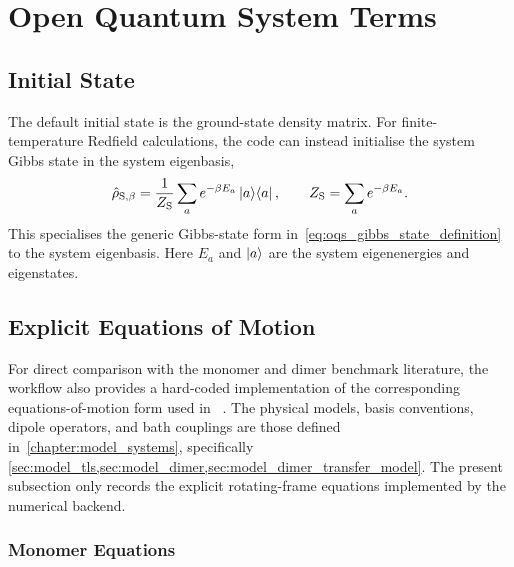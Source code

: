 \section{Open Quantum System Terms}
\label{app:sec:oqs_evolution}

\subsection{Initial State}

The default initial state is the ground-state density matrix. For
finite-temperature Redfield calculations, the code can instead initialise the
system Gibbs state in the system eigenbasis,
\begin{equation*}
\hat{\rho}_{\mathrm{S},\beta}
=
\frac{1}{Z_{\mathrm{S}}}\sum_{a} e^{-\beta E_a}\ket{a}\!\bra{a},
\qquad
Z_{\mathrm{S}}=\sum_a e^{-\beta E_a}.
\end{equation*}
This specialises the generic Gibbs-state form in~\autoref{eq:oqs_gibbs_state_definition}
to the system eigenbasis. Here \(E_a\) and \(\ket{a}\) are the system eigenenergies and eigenstates.


\subsection{Explicit Equations of Motion}
\label{app:sec:paper_eqs_explicit_eoms}

For direct comparison with the monomer and dimer benchmark literature, the
workflow also provides a hard-coded implementation of the corresponding
equations-of-motion form used in
~\cite{mancaletal2006twodimensionalopticalthreepulse,pisliakovetal2006twodimensionalopticalthreepulse}.
The physical models, basis conventions, dipole operators, and bath couplings
are those defined in~\autoref{chapter:model_systems}, specifically
\cref{sec:model_tls,sec:model_dimer,sec:model_dimer_transfer_model}.
The present subsection only records the explicit rotating-frame equations
implemented by the numerical backend.


\subsubsection{Monomer Equations}

